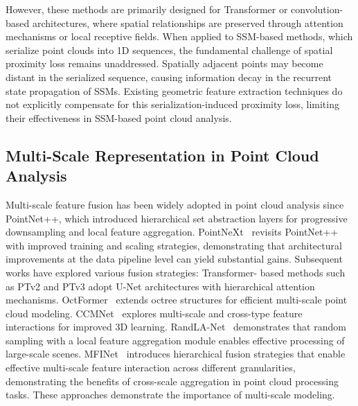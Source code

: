 \documentclass[a4paper,fleqn]{cas-sc}
\begin{document}
However, these methods are primarily designed for Transformer or convolution-based architectures, where spatial relationships are preserved through attention mechanisms or local receptive fields. When applied to SSM-based methods, which serialize point clouds into 1D sequences, the fundamental challenge of spatial proximity loss remains unaddressed. Spatially adjacent points may become distant in the serialized sequence, causing information decay in the recurrent state propagation of SSMs. Existing geometric feature extraction techniques do not explicitly compensate for this serialization-induced proximity loss, limiting their effectiveness in SSM-based point cloud analysis.


\subsection{Multi-Scale Representation in Point Cloud Analysis}

Multi-scale feature fusion has been widely adopted in point cloud analysis since PointNet++\cite{PointNet++}, which introduced hierarchical set abstraction
layers for progressive downsampling and local feature aggregation. PointNeXt~\cite{pointnext} revisits PointNet++ with improved training and scaling strategies, demonstrating that architectural improvements at the data pipeline level can yield substantial gains. Subsequent
works have explored various fusion strategies: Transformer-
based methods such as PTv2 \cite{ptv2} and PTv3 \cite{ptv3} adopt U-Net
architectures with hierarchical attention mechanisms. OctFormer~\cite{octformer2} extends octree structures for efficient multi-scale point cloud modeling. CCMNet~\cite{ccmnet} explores multi-scale and cross-type feature interactions for improved 3D learning. RandLA-Net~\cite{Randla} demonstrates that random sampling with a local feature aggregation module enables effective processing of large-scale scenes. MFINet~\cite{MFINet} introduces hierarchical fusion strategies that enable effective multi-scale feature interaction across different granularities, demonstrating the benefits of cross-scale aggregation in point cloud processing tasks. These approaches
demonstrate the importance of multi-scale modeling.
\end{document}
